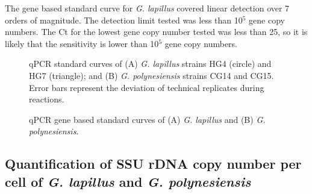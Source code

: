 \documentclass[12pt]{article}
\begin{document}
The gene based standard curve for \emph{G. lapillus} covered linear detection over 7 orders of magnitude. The detection limit tested was less than 10$^{5}$ gene copy numbers. The Ct for the lowest gene copy number tested was less than 25, so it is likely that the sensitivity is lower than 10$^{5}$ gene copy numbers.
\FloatBarrier
\begin{figure}
\caption{qPCR standard curves of (A) \emph{G. lapillus} strains HG4 (circle) and HG7 (triangle); and (B) \emph{G. polynesiensis} strains CG14 and CG15. Error bars represent the deviation of technical replicates during reactions.}
\label{fig:stdCurve}
\caption{qPCR gene based standard curves of (A) \emph{G. lapillus} and (B) \emph{G. polynesiensis}.} %
\label{fig:lapigblocks}
\end{figure}
\FloatBarrier

\subsection*{Quantification of SSU rDNA copy number per cell of \emph{G. lapillus} and \emph{G. polynesiensis}}
\end{document}
